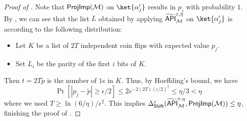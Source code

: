 \begin{proof}[Proof of ]
  Note that $\mathsf{ProjImp}(\mathcal{M})$ on  $\ket{\alpha'_j}$ 
results in $p_j$ with probability $1$.   
By , we can see that the list $L$ obtained by applying $\widetilde{\mathsf{API}}_{\mathcal{M}}^{\varepsilon,\eta}$ on $\ket{\alpha'_j}$  is according to the following distribution:
\begin{itemize}
\item Let $K$ be a list of $2T$ independent coin flips with expected value $p_j$.
\item Set $L_i$ be the parity of the first $i$ bits of $K$.
\end{itemize}
Then $t=2T\tilde{p}$ is the number of $1$s in $K$. Thus, by Hoeffding's bound, we have 
$$
\Pr[|p_j-\tilde{p}|\ge \epsilon/2]\le 2e^{-2(2T)(\epsilon/2)^2}\le \eta/3<\eta
$$
where we used $T\ge \ln(6/\eta)/\epsilon^2$. 
This implies 
$\Delta_{\mathsf{Shift}}^{\varepsilon}(\widetilde{\mathsf{API}}_{\mathcal{M}}^{\varepsilon,\eta},\mathsf{ProjImp}(\mathcal{M}))\le \eta$, finishing the proof of . 


\end{proof}
